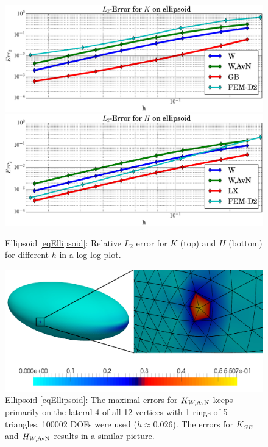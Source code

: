   \begin{figure}
    \centering\includegraphics[width=.49\textwidth]{bilder/ellipsoid/L2K.eps}
    \centering\includegraphics[width=.49\textwidth]{bilder/ellipsoid/L2H.eps}
    \caption{Ellipsoid \eqref{eqEllipsoid}: Relative \( L_{2} \) error for \( K \) (top) and
                                                     \( H \) (bottom) for different \( h \) in a log-log-plot.}
    \label{figEllipsoidL2Err}
  \end{figure}

  \begin{figure}
    \centering\includegraphics[width=.49\textwidth]{bilder/ellipsoid/ErrView.jpg}
    \caption{Ellipsoid \eqref{eqEllipsoid}:
                  The maximal errors for \( K_{W,\text{AvN}} \) keeps primarily  on the lateral 4 of all 12 vertices with 1-rings of 5 triangles.
                  100002 DOFs were used (\( h\approx 0.026 \)).
                  The errors for \( K_{GB} \) and \( H_{W,\text{AvN}} \) results in a similar picture.}
    \label{figEllipsoidErrView}
  \end{figure}

